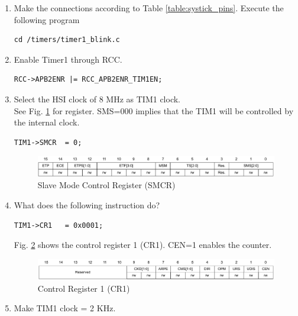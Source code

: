 \begin{enumerate}[label=\arabic*.,ref=\theenumi]
\subsection{TIMER-1}
\item Make the connections according to Table \ref{table:systick_pins}.  Execute the following program
\begin{lstlisting}
cd /timers/timer1_blink.c
\end{lstlisting}
\label{prob:APB2_TIM1}
\item Enable Timer1 through RCC.
\\
\solution 
\begin{lstlisting}
RCC->APB2ENR |= RCC_APB2ENR_TIM1EN;  
\end{lstlisting}
\item Select the HSI clock of 8 MHz as TIM1 clock.
\\
\solution See Fig.  \ref{fig:smcr} for register. SMS=000 implies that the TIM1 will be controlled by the internal clock.
\begin{lstlisting}
TIM1->SMCR  = 0;
\end{lstlisting}
\begin{figure}[!ht]
\includegraphics[width=\columnwidth]{stm32/timers/figs/smcr}
\caption{Slave Mode Control Register (SMCR)}
\label{fig:smcr}
\end{figure}
\item What does the following instruction do?
\begin{lstlisting}
TIM1->CR1 	= 0x0001;
\end{lstlisting}
\solution Fig. \ref{fig:cr1} shows the control register 1 (CR1). CEN=1 enables the counter.
\begin{figure}[!ht]
\begin{center}
\includegraphics[width=\columnwidth]{stm32/timers/figs/cr1}
\end{center}
\caption{Control Register 1 (CR1)}
\label{fig:cr1}
\end{figure}
\item Make TIM1 clock = 2 KHz.
\\

\end{enumerate}
